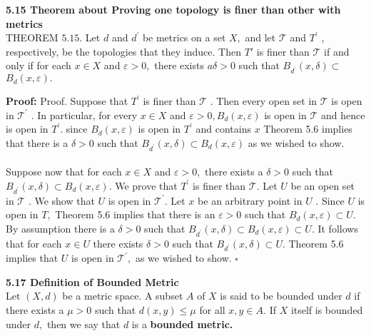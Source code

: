 \documentclass[12pt]{article}
\newenvironment{proofed}[1][]{\par \medskip \noindent \textbf{#1 Proof: }}{\hfill$\square$}
\newenvironment{defn}[2][]{\par \medskip \noindent \textbf{#1 Definition of \large#2 \medskip \\}}{\rmfamily \medskip}
\newenvironment{thm}[2][]{\par \medskip \noindent \textbf{#1 Theorem about \large#2 \medskip \\}}{\rmfamily \medskip}
\begin{document}
	\begin{thm}[5.15]{Proving one topology is finer than other with metrics}
		THEOREM $5.15 .$ Let $d$ and $d ^ { \prime }$ be metrics on a set $X ,$ and let $\mathcal { T }$ and $T ^ { \prime }$ ,
		respectively, be the topologies that they induce. Then $T'$ is finer than $\mathcal { T }$ if and only if for each $x \in X$ and $\varepsilon > 0 ,$ there exists $a \delta > 0$ such that $B _ { d ^ { \prime } } ( x , \delta ) \subset$
		$B _ { d } ( x , \varepsilon ) .$ 
		\begin{proofed}
			Proof. Suppose that $T ^ { \prime }$ is finer than $\mathcal { T }$ . Then every open set in $\mathcal { T }$ is open
			in $\mathcal { T } ^ { \prime }$ . In particular, for every $x \in X$ and $\varepsilon > 0 , B _ { d } ( x , \varepsilon )$ is open in $\mathcal { T }$ and hence is open in $T ^ { \prime } .$ since $B _ { d } ( x , \varepsilon )$ is open in $T ^ { \prime }$ and contains $x$
			Theorem 5.6 implies that there is a $\delta > 0$ such that $B _ { d ^ { \prime } } ( x , \delta ) \subset B _ { d } ( x , \varepsilon )$
			as we wished to show.\\
			\\
			Suppose now that for each $x \in X$ and $\varepsilon > 0 ,$ there exists a $\delta > 0$
			such that $B _ { d ^ { \prime } } ( x , \delta ) \subset B _ { d } ( x , \varepsilon ) .$ We prove that $T ^ { \prime }$ is finer than $\mathcal { T } .$ Let $U$
			be an open set in $\mathcal { T }$ . We show that $U$ is open in $\mathcal { T } ^ { \prime } .$ Let $x$ be an arbitrary point in $U$ . Since $U$ is open in $T ,$ Theorem 5.6 implies that there is an
			$\varepsilon > 0$ such that $B _ { d } ( x , \varepsilon ) \subset U .$ By assumption there is a $\delta > 0$ such that
			$B _ { d ^ { \prime } } ( x , \delta ) \subset B _ { d } ( x , \varepsilon ) \subset U .$ It follows that for each $x \in U$ there exists $\delta > 0$ such that $B _ { d^ { \prime } } ( x , \delta ) \subset U .$ Theorem 5.6 implies that $U$ is open in
			$\mathcal { T } ^ { \prime } ,$ as we wished to show.
		\end{proofed}
	\end{thm}
		\begin{defn}[5.17]{Bounded Metric}
			Let $( X , d )$ be a metric space. A subset $A$ of $X$ is said
			to be bounded under $d$ if there exists a $\mu > 0$ such that $d ( x , y ) \leq \mu$ for all $x , y \in A .$ If $X$ itself is bounded under $d ,$ then we say that $d$ is a \textbf{bounded
			metric.}
		\end{defn}
\end{document}
